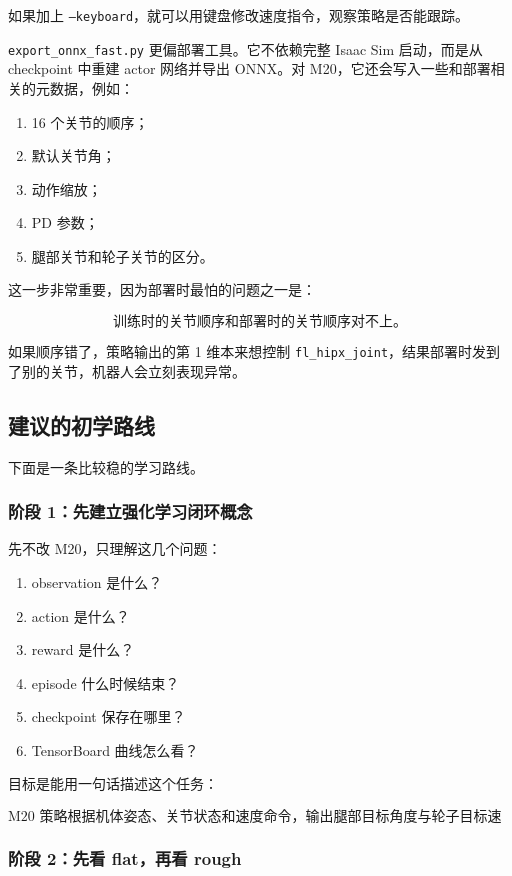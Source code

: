 \documentclass[UTF8,11pt,a4paper]{ctexart}
\begin{document}
如果加上 \texttt{--keyboard}，就可以用键盘修改速度指令，观察策略是否能跟踪。

\texttt{export\_onnx\_fast.py} 更偏部署工具。它不依赖完整 Isaac Sim 启动，而是从 checkpoint 中重建 actor 网络并导出 ONNX。对 M20，它还会写入一些和部署相关的元数据，例如：

\begin{enumerate}
  \item 16 个关节的顺序；
  \item 默认关节角；
  \item 动作缩放；
  \item PD 参数；
  \item 腿部关节和轮子关节的区分。
\end{enumerate}

这一步非常重要，因为部署时最怕的问题之一是：

\[
\boxed{
\text{训练时的关节顺序和部署时的关节顺序对不上。}
}
\]

如果顺序错了，策略输出的第 1 维本来想控制 \texttt{fl\_hipx\_joint}，结果部署时发到了别的关节，机器人会立刻表现异常。

\subsection{建议的初学路线}

下面是一条比较稳的学习路线。

\subsubsection{阶段 1：先建立强化学习闭环概念}

先不改 M20，只理解这几个问题：

\begin{enumerate}
  \item observation 是什么？
  \item action 是什么？
  \item reward 是什么？
  \item episode 什么时候结束？
  \item checkpoint 保存在哪里？
  \item TensorBoard 曲线怎么看？
\end{enumerate}

目标是能用一句话描述这个任务：

\[
\boxed{
\text{M20 策略根据机体姿态、关节状态和速度命令，输出腿部目标角度与轮子目标速度，使机器人稳定跟踪速度指令。}
}
\]

\subsubsection{阶段 2：先看 flat，再看 rough}
\end{document}
